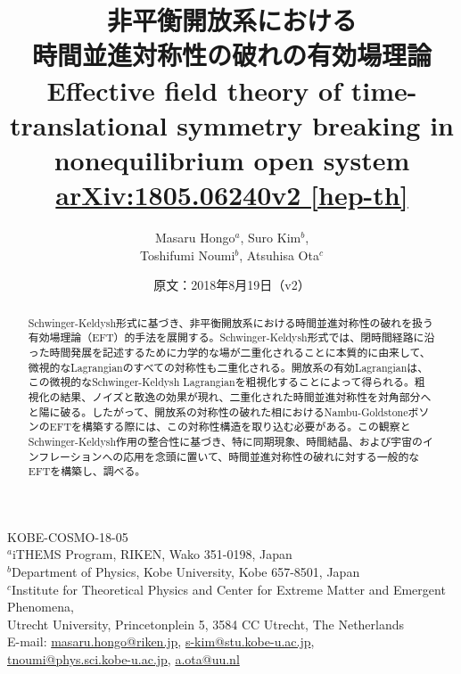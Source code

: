 \documentclass[a4paper,11pt]{ltjsarticle}
\title{\bfseries 非平衡開放系における\\時間並進対称性の破れの有効場理論\\[0.5em]
\large Effective field theory of time-translational symmetry breaking in nonequilibrium open system\\[0.6em]
\normalsize \href{https://arxiv.org/pdf/1805.06240v2}{arXiv:1805.06240v2 [hep-th]}}
\author{Masaru Hongo$^{a}$, Suro Kim$^{b}$,\\Toshifumi Noumi$^{b}$, Atsuhisa Ota$^{c}$}
\date{原文：2018年8月19日（v2）}
\numberwithin{equation}{section}
\begin{document}
\maketitle
\begin{center}
\small
KOBE-COSMO-18-05\\[0.4em]
$^{a}$iTHEMS Program, RIKEN, Wako 351-0198, Japan\\[0.3em]
$^{b}$Department of Physics, Kobe University, Kobe 657-8501, Japan\\[0.3em]
$^{c}$Institute for Theoretical Physics and Center for Extreme Matter and Emergent Phenomena,\\
Utrecht University, Princetonplein 5, 3584 CC Utrecht, The Netherlands\\[0.5em]
E-mail: \href{mailto:masaru.hongo@riken.jp}{masaru.hongo@riken.jp},
\href{mailto:s-kim@stu.kobe-u.ac.jp}{s-kim@stu.kobe-u.ac.jp},\\
\href{mailto:tnoumi@phys.sci.kobe-u.ac.jp}{tnoumi@phys.sci.kobe-u.ac.jp},
\href{mailto:a.ota@uu.nl}{a.ota@uu.nl}
\end{center}
\begin{abstract}
Schwinger-Keldysh形式に基づき、非平衡開放系における時間並進対称性の破れを扱う有効場理論（EFT）的手法を展開する。Schwinger-Keldysh形式では、閉時間経路に沿った時間発展を記述するために力学的な場が二重化されることに本質的に由来して、微視的なLagrangianのすべての対称性も二重化される。開放系の有効Lagrangianは、この微視的なSchwinger-Keldysh Lagrangianを粗視化することによって得られる。粗視化の結果、ノイズと散逸の効果が現れ、二重化された時間並進対称性を対角部分へと陽に破る。したがって、開放系の対称性の破れた相におけるNambu-GoldstoneボソンのEFTを構築する際には、この対称性構造を取り込む必要がある。この観察とSchwinger-Keldysh作用の整合性に基づき、特に同期現象、時間結晶、および宇宙のインフレーションへの応用を念頭に置いて、時間並進対称性の破れに対する一般的なEFTを構築し、調べる。
\end{abstract}
\clearpage
\hypertarget{toc}{}
\tableofcontents
\clearpage




\clearpage
\renewcommand{\refname}{\hyperlink{toc}{参考文献}}


\end{document}
